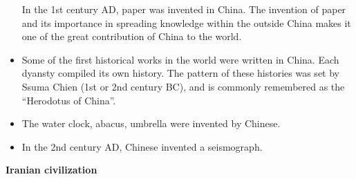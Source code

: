 \documentclass[
  openany]{book}
\begin{document}
\begin{itemize}
  In the 1st century AD, paper was invented in China. The invention of paper and its importance in spreading knowledge within the outside China makes it one of the great contribution of China to the world.
\item
  Some of the first historical works in the world were written in China. Each dyansty compiled its own history. The pattern of these histories was set by Ssuma Chien (1st or 2nd century BC), and is commonly remembered as the ``Herodotus of China''.
\item
  The water clock, abacus, umbrella were invented by Chinese.
\item
  In the 2nd century AD, Chinese invented a seismograph.
\end{itemize}

\textbf{Iranian civilization}
\end{document}
